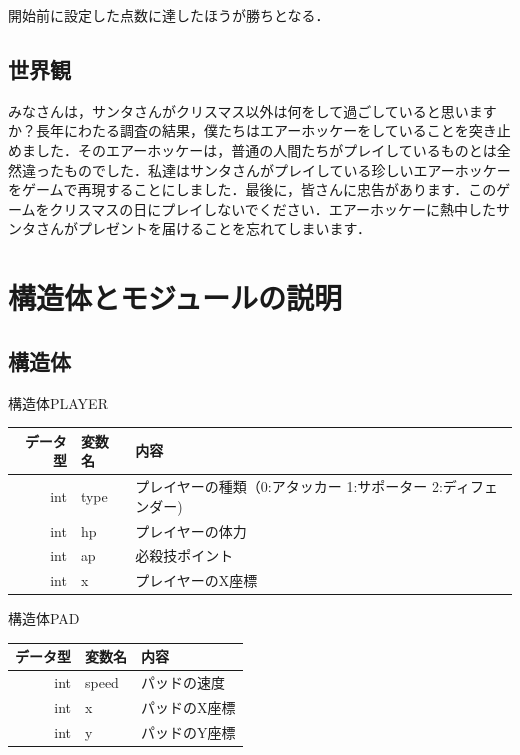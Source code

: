 \documentclass{jarticle}
\begin{document}
開始前に設定した点数に達したほうが勝ちとなる．
%
\subsection{世界観}
\begin{boxnote}
みなさんは，サンタさんがクリスマス以外は何をして過ごしていると思いますか？長年にわたる調査の結果，僕たちはエアーホッケーをしていることを突き止めました．そのエアーホッケーは，普通の人間たちがプレイしているものとは全然違ったものでした．私達はサンタさんがプレイしている珍しいエアーホッケーをゲームで再現することにしました．最後に，皆さんに忠告があります．このゲームをクリスマスの日にプレイしないでください．エアーホッケーに熱中したサンタさんがプレゼントを届けることを忘れてしまいます．
\end{boxnote}
\section{構造体とモジュールの説明}
\subsection{構造体}
構造体PLAYER
\begin{table}[H]
  \begin{center}
    \begin{tabular}{|r||p{4em}|p{30em}|} \hline
      データ型 & 変数名 & 内容 \\ \hline
      int & type & プレイヤーの種類（0:アタッカー 1:サポーター 2:ディフェンダー)\\
        int & hp & プレイヤーの体力\\
        int & ap & 必殺技ポイント\\
        int & x & プレイヤーのX座標\\ \hline
    \end{tabular}
  \end{center}
\end{table}
構造体PAD
\begin{table}[H]
  \begin{center}
    \begin{tabular}{|r||p{4em}|p{30em}|} \hline
      データ型 & 変数名 & 内容 \\ \hline
      int & speed & パッドの速度\\
      int & x & パッドのX座標\\
      int & y & パッドのY座標\\ \hline
    \end{tabular}
  \end{center}
\end{table}
%
\end{document}
